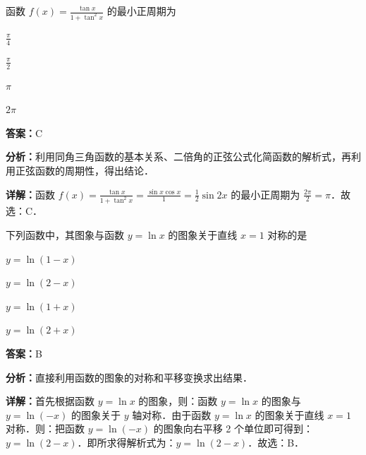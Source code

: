 \begin{question}[points=5]
函数 $f(x) = \frac{\tan x}{1+\tan^2 x}$ 的最小正周期为
\begin{choices}
  \item $\frac{\pi}{4}$
  \item $\frac{\pi}{2}$
  \item $\pi$
  \item $2\pi$
\end{choices}
\begin{solution}
\textbf{答案：}C

\textbf{分析：}利用同角三角函数的基本关系、二倍角的正弦公式化简函数的解析式，再利用正弦函数的周期性，得出结论．

\textbf{详解：}函数 $f(x) = \frac{\tan x}{1+\tan^2 x} = \frac{\sin x \cos x}{1} = \frac{1}{2}\sin 2x$ 的最小正周期为 $\frac{2\pi}{2} = \pi$．故选：C．
\end{solution}
\end{question}

\begin{question}[points=5]
下列函数中，其图象与函数 $y=\ln x$ 的图象关于直线 $x=1$ 对称的是
\begin{choices}
  \item $y=\ln(1-x)$
  \item $y=\ln(2-x)$
  \item $y=\ln(1+x)$
  \item $y=\ln(2+x)$
\end{choices}
\begin{solution}
\textbf{答案：}B

\textbf{分析：}直接利用函数的图象的对称和平移变换求出结果．

\textbf{详解：}首先根据函数 $y=\ln x$ 的图象，则：函数 $y=\ln x$ 的图象与 $y=\ln(-x)$ 的图象关于 $y$ 轴对称．由于函数 $y=\ln x$ 的图象关于直线 $x=1$ 对称．则：把函数 $y=\ln(-x)$ 的图象向右平移 2 个单位即可得到：$y=\ln(2-x)$．即所求得解析式为：$y=\ln(2-x)$．故选：B．
\end{solution}
\end{question}

